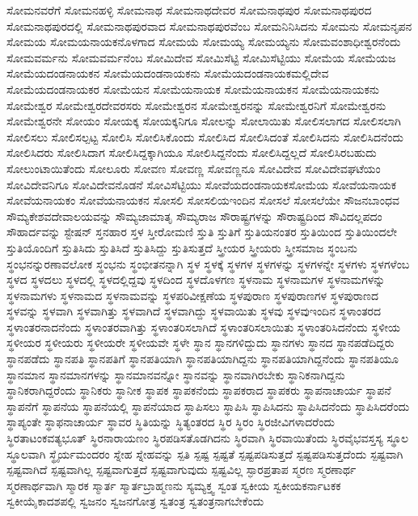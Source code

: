{ಸೋಮನವರೆಗೆ
ಸೋಮನಹಳ್ಳಿ
ಸೋಮನಾಥ
ಸೋಮನಾಥದೇವರ
ಸೋಮನಾಥಪುರ
ಸೋಮನಾಥಪುರದ
ಸೋಮನಾಥಪುರದಲ್ಲಿ
ಸೋಮನಾಥಪುರವಾದ
ಸೋಮನಾಥಪುರವೆಂಬ
ಸೋಮನಿನಿಸಿದನು
ಸೋಮನು
ಸೋಮನೃಪನ
ಸೋಮಯ
ಸೋಮಯನಾಯಕನೊಳಗಾದ
ಸೋಮಯೆ
ಸೋಮಯ್ಯ
ಸೋಮಯ್ಯನು
ಸೋಮವಂಶಾಧೀಶ್ವರನೆಂದು
ಸೋಮವರ್ಮನು
ಸೋಮವರ್ಮನೆಂಬ
ಸೋಮಿದೇವ
ಸೋಮಿಸೆಟ್ಟಿ
ಸೋಮಿಸೆಟ್ಟಿಯು
ಸೋಮೆಯ
ಸೋಮೆಯಜ
ಸೋಮೆಯದಂಡನಾಯಕನ
ಸೋಮೆಯದಂಡನಾಯಕನು
ಸೋಮೆಯದಂಡನಾಯಕಮಲ್ಲಿದೇವ
ಸೋಮೆಯದಂಡನಾಯಕರ
ಸೋಮೆಯನ
ಸೋಮೆಯನಾಯಕ
ಸೋಮೆಯನಾಯಕನ
ಸೋಮೆಯನಾಯಕನು
ಸೋಮೇಶ್ವರ
ಸೋಮೇಶ್ವರದೇವರಸರು
ಸೋಮೇಶ್ವರನ
ಸೋಮೇಶ್ವರನನ್ನು
ಸೋಮೇಶ್ವರನಿಗೆ
ಸೋಮೇಶ್ವರನು
ಸೋಮೇಶ್ವರನೇ
ಸೋಯಂ
ಸೋಯಕ್ಕ
ಸೋಯಕ್ಕನಿಗೂ
ಸೋಲನ್ನು
ಸೋಲಾಯಿತು
ಸೋಲಿಸಲಾಗದ
ಸೋಲಿಸಲಾಗಿ
ಸೋಲಿಸಲು
ಸೋಲಿಸಲ್ಪಟ್ಟ
ಸೋಲಿಸಿ
ಸೋಲಿಸಿಕೊಂದು
ಸೋಲಿಸಿದ
ಸೋಲಿಸಿದಂತೆ
ಸೋಲಿಸಿದನು
ಸೋಲಿಸಿದನೆಂದು
ಸೋಲಿಸಿದರು
ಸೋಲಿಸಿದಾಗ
ಸೋಲಿಸಿದ್ದಕ್ಕಾಗಿಯೂ
ಸೋಲಿಸಿದ್ದನೆಂದು
ಸೋಲಿಸಿದ್ದಲ್ಲದೆ
ಸೋಲಿಸಿರಬಹುದು
ಸೋಲುಂಟಾಯಿತೆಂದು
ಸೋಲೂರು
ಸೋವಣ
ಸೋವಣ್ಣ
ಸೋವಣ್ಣನೂ
ಸೋವಿದೇವ
ಸೋವಿದೇವಘಟೆಯಂ
ಸೋವಿದೇವನಿಗೂ
ಸೋವಿದೇವನೊಡನೆ
ಸೋವಿಸೆಟ್ಟಿಯು
ಸೋವೆಯದಂಡನಾಯಕಸೋಮೆಯ
ಸೋವೆಯನಾಯಕ
ಸೋವೆಯನಾಯಕಂ
ಸೋವೆಯನಾಯಕನ
ಸೋಸಲಿ
ಸೋಸಲಿಯಇಂದಿನ
ಸೋಸಲೆ
ಸೋಸಲೆಯೇ
ಸೌಜನಬಾಂಧವ
ಸೌಮ್ಯಕೇಶವದೇವಾಲಯವನ್ನು
ಸೌಮ್ಯಜಾಮಾತೃ
ಸೌಮ್ಯರಾಜ
ಸೌರಾಷ್ಟ್ರಗಳನ್ನು
ಸೌರಾಷ್ಟ್ರದಿಂದ
ಸೌವಿದಲ್ಲಪದಂ
ಸೌಹಾರ್ದವನ್ನು
ಸ್ಟೇಷನ್
ಸ್ತನಹಾರ
ಸ್ತಳ
ಸ್ತೀರೋಮಣಿ
ಸ್ತುತಿ
ಸ್ತುತಿಗೆ
ಸ್ತುತಿಯನಂತರ
ಸ್ತುತಿಯಿಂದ
ಸ್ತುತಿಯಿಂದಲೇ
ಸ್ತುತಿಯೊಂದಿಗೆ
ಸ್ತುತಿಸಿದು
ಸ್ತುತಿಸಿದೆ
ಸ್ತುತಿಸಿದ್ದು
ಸ್ತುತಿಸುತ್ತದೆ
ಸ್ತ್ರೀಯರ
ಸ್ತ್ರೀಯರು
ಸ್ತ್ರೀಸಮಾಜ
ಸ್ಥಂಬನು
ಸ್ಥಂಭನನ್ನುರಣಾವಲೋಕ
ಸ್ಥಂಭನು
ಸ್ಥಂಭೀತನನ್ನಾಗಿ
ಸ್ಥಳ
ಸ್ಥಳಕ್ಕೆ
ಸ್ಥಳಗಳ
ಸ್ಥಳಗಳನ್ನು
ಸ್ಥಳಗಳನ್ನೇ
ಸ್ಥಳಗಳು
ಸ್ಥಳಗಳೆಂಬ
ಸ್ಥಳದ
ಸ್ಥಳದಲು
ಸ್ಥಳದಲ್ಲಿ
ಸ್ಥಳದಲ್ಲಿದ್ದವು
ಸ್ಥಳದಿಂದ
ಸ್ಥಳದೊಳಗಣ
ಸ್ಥಳನಾಮ
ಸ್ಥಳನಾಮಗಳ
ಸ್ಥಳನಾಮಗಳನ್ನು
ಸ್ಥಳನಾಮಗಳು
ಸ್ಥಳನಾಮದ
ಸ್ಥಳನಾಮವನ್ನು
ಸ್ಥಳಪರಿವೀಕ್ಷಣೆಯ
ಸ್ಥಳಪುರಾಣ
ಸ್ಥಳಪುರಾಣಗಳ
ಸ್ಥಳಪುರಾಣದ
ಸ್ಥಳವನ್ನು
ಸ್ಥಳವಾಗಿ
ಸ್ಥಳವಾಗಿತ್ತು
ಸ್ಥಳವಾಗಿದೆ
ಸ್ಥಳವಾಗಿದ್ದು
ಸ್ಥಳವಾಯಿತು
ಸ್ಥಳವು
ಸ್ಥಳವುಇಂದಿನ
ಸ್ಥಳಾಂತರದ
ಸ್ಥಳಾಂತರನಾದನೆಂದು
ಸ್ಥಳಾಂತರವಾಗಿತ್ತು
ಸ್ಥಳಾಂತರಿಸಲಾಗಿದೆ
ಸ್ಥಳಾಂತರಿಸಲಾಯಿತು
ಸ್ಥಳಾಂತರಿಸಿದನೆಂದು
ಸ್ಥಳೀಯ
ಸ್ಥಳೀಯರ
ಸ್ಥಳೀಯರು
ಸ್ಥಳೀಯರೇ
ಸ್ಥಳೀಯವೇ
ಸ್ಥಳೇ
ಸ್ಥಾನ
ಸ್ಥಾನಗಳಿದ್ದುದು
ಸ್ಥಾನಗಳು
ಸ್ಥಾನದ
ಸ್ಥಾನಪಡೆದಿದ್ದರು
ಸ್ಥಾನಪಡೆದು
ಸ್ಥಾನಪತಿ
ಸ್ಥಾನಪತಿಗೆ
ಸ್ಥಾನಪತಿಯಾಗಿ
ಸ್ಥಾನಪತಿಯಾಗಿದ್ದನು
ಸ್ಥಾನಪತಿಯಾಗಿದ್ದನೆಂದು
ಸ್ಥಾನಪತಿಯೂ
ಸ್ಥಾನಮಾನ
ಸ್ಥಾನಮಾನಗಳನ್ನು
ಸ್ಥಾನಮಾನವನ್ನೋ
ಸ್ಥಾನವನ್ನು
ಸ್ಥಾನವಾಗಿರಬೇಕು
ಸ್ಥಾನಿಕನಾಗಿದ್ದನು
ಸ್ಥಾನಿಕರಾಗಿದ್ದರೆಂದು
ಸ್ಥಾನಿಕರು
ಸ್ಥಾನೀಕ
ಸ್ಥಾಪಕ
ಸ್ಥಾಪಕನೆಂದು
ಸ್ಥಾಪಕರಾದ
ಸ್ಥಾಪಕರು
ಸ್ಥಾಪನಾಚಾರ್ಯ
ಸ್ಥಾಪನೆ
ಸ್ಥಾಪನೆಗೆ
ಸ್ಥಾಪನೆಯ
ಸ್ಥಾಪನೆಯಲ್ಲಿ
ಸ್ಥಾಪನೆಯಾದ
ಸ್ಥಾಪಿಸಲು
ಸ್ಥಾಪಿಸಿ
ಸ್ಥಾಪಿಸಿದನು
ಸ್ಥಾಪಿಸಿದನೆಂದು
ಸ್ಥಾಪಿಸಿದರೆಂದು
ಸ್ಥಾಪ್ಯಂತೇ
ಸ್ಥಾಫನಾಚಾರ್ಯ
ಸ್ಥಾವರ
ಸ್ಥಿತಿಯನ್ನು
ಸ್ಥಿತ್ಯಂತರದ
ಸ್ಥಿರ
ಸ್ಥಿರಂ
ಸ್ಥಿರಜೀವಿಗಳಾದರೆಂದು
ಸ್ಥಿರತಾಟಂಕವತ್ಯಭೂತ್
ಸ್ಥಿರನಾರಾಯಣಂ
ಸ್ಥಿರಪಡಿಸತೊಡಗಿದನು
ಸ್ಥಿರವಾಗಿ
ಸ್ಥಿರವಾಯಿತೆಂದು
ಸ್ಥಿರವೈಭವಸ್ತಸ್ಯ
ಸ್ಥೂಲ
ಸ್ಥೂಲವಾಗಿ
ಸ್ಥೈರ್ಯಮಂದರಂ
ಸ್ನೇಹ
ಸ್ನೇಹವನ್ನು
ಸ್ಪತಿ
ಸ್ಪಷ್ಟ
ಸ್ಪಷ್ಟತೆ
ಸ್ಪಷ್ಟಪಡಿಸುತ್ತದೆ
ಸ್ಪಷ್ಟಪಡಿಸುತ್ತದೆಂದು
ಸ್ಪಷ್ಟವಾಗಿ
ಸ್ಪಷ್ಟವಾಗಿದೆ
ಸ್ಪಷ್ಟವಾಗಿಲ್ಲ
ಸ್ಪಷ್ಟವಾಗುತ್ತದೆ
ಸ್ಪಷ್ಟವಾಗುವುದು
ಸ್ಪಷ್ಟವಿಲ್ಲ
ಸ್ಫಾರಪ್ರತಾಪ
ಸ್ಮರಣ
ಸ್ಮರಣಾರ್ಥ
ಸ್ಮರಣಾರ್ಥವಾಗಿ
ಸ್ಮಾರಕ
ಸ್ಮಾರ್ತ
ಸ್ಮಾರ್ತಬ್ರಾಹ್ಮಣನು
ಸ್ಯಮ್ಯಕ್ತ್ವ
ಸ್ವಂತ
ಸ್ವಕೀಯ
ಸ್ವಕೀಯಕರ್ನಾಟಕಕ
ಸ್ವಕೀಯೈಕಾದಶಪಲ್ಲಿ
ಸ್ವಜನಂ
ಸ್ವಜನಗೋತ್ರ
ಸ್ವತಂತ್ರ
ಸ್ವತಂತ್ರನಾಗಬೇಕೆಂದು
}
